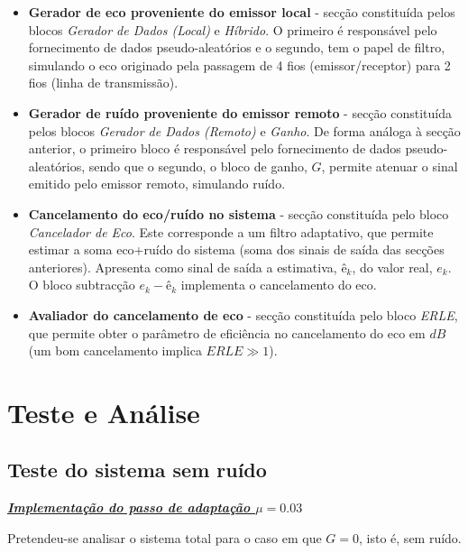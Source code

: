 \documentclass[a4paper,11pt]{report}
\begin{document}
\begin{itemize}
\item  \textbf{Gerador de eco proveniente do emissor local} - secção constituída pelos blocos \textit{Gerador de Dados (Local)} e \textit{Híbrido}. O primeiro é responsável pelo fornecimento de dados pseudo-aleatórios e o segundo, tem o papel de filtro, simulando o eco originado pela passagem de 4 fios (emissor/receptor) para 2 fios (linha de transmissão).

\item \textbf{Gerador de ruído proveniente do emissor remoto} - secção constituída pelos blocos \textit{Gerador de Dados (Remoto)} e \textit{Ganho}. De forma análoga à secção anterior, o primeiro bloco é responsável pelo fornecimento de dados pseudo-aleatórios, sendo que o segundo, o bloco de ganho, $G$, permite atenuar o sinal emitido pelo emissor remoto, simulando ruído.

\item \textbf{Cancelamento do eco/ruído no sistema} - secção constituída pelo bloco \textit{Cancelador de Eco}. Este corresponde a um filtro adaptativo, que permite estimar a soma eco+ruído do sistema (soma dos sinais de saída das secções anteriores). Apresenta como sinal de saída a estimativa, $ê_k$, do valor real, $e_k$. O bloco subtracção  $e_k-ê_k$ implementa o cancelamento do eco.

\item \textbf{Avaliador do cancelamento de eco} - secção constituída pelo bloco \textit{ERLE}, que permite obter o parâmetro de eficiência no cancelamento do eco em $dB$ (um bom cancelamento implica $ERLE\gg 1$).
\end{itemize}





\section{Teste e Análise}

\subsection{Teste do sistema sem ruído}



\large\underline{{\textit{\textbf{Implementação do passo de adaptação $\mu=0.03$}}}}\\
\par
Pretendeu-se analisar o sistema total para o caso em que $G=0$, isto é, sem ruído. 
\end{document}
